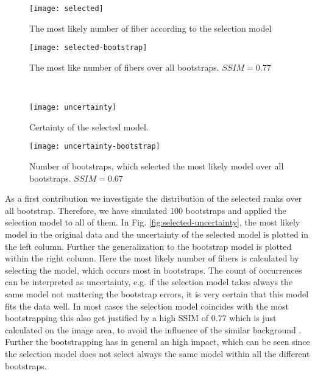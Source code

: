 \begin{figure*}[h]
	\centering
	\begin{subfigure}[b]{0.33\linewidth}
		\texttt{[image: selected]}
		\caption{The most likely number of fiber according to the
		selection model}
	\end{subfigure}
	\begin{subfigure}[b]{0.33\linewidth}
		\texttt{[image: selected-bootstrap]}
		\caption{The most like number of fibers over all bootstraps.
		$SSIM=0.77$}
\end{subfigure}  \\

	\begin{subfigure}[b]{0.33\linewidth}
		\texttt{[image: uncertainty]}
		\caption{Certainty of the selected model.}
	\end{subfigure}
	\begin{subfigure}[b]{0.33\linewidth}
		\texttt{[image: uncertainty-bootstrap]}
		\caption{Number of bootstraps, which selected the most likely
		model over all bootstraps. $SSIM=0.67$}
	\end{subfigure}
	\caption{Comparison of model selection with and without bootstrapping.}
	\label{fig:selected-uncertainty}
\end{figure*}
As a first contribution we investigate the distribution of the selected ranks
over all bootstrap. Therefore, we have simulated 100 bootstraps and applied the
selection model to all of them. In Fig. \ref{fig:selected-uncertainty}, the most
likely model in the original data and the uncertainty of the selected model is
plotted in the left column. Further the generalization to the bootstrap model is
plotted within the right column. Here the most likely number of fibers is
calculated by selecting the model, which occurs most in bootstraps. The count of
occurrences can be interpreted as uncertainty, e.g. if the selection model takes
always the same model not mattering the bootstrap errors, it is very certain
that this model fits the data well.  
In most cases the selection model coincides with the most bootstrapping this
also get justified by a high SSIM of $0.77$ which is just calculated on the
image area, to avoid the influence of the similar background
\cite{wang2004image}.  Further the
bootstrapping has in general an high impact, which can be seen since the
selection model does not select always the same model within all the different
bootstraps.  



